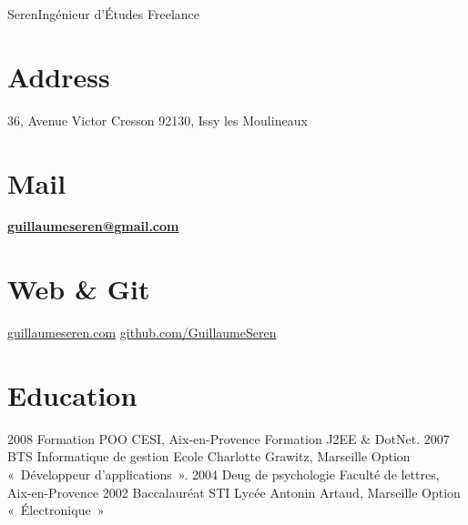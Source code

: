 \documentclass[print]{GuillaumeSeren-cv}
\begin{document}
 {Seren}{Ingénieur d'Études Freelance}

\begin{aside}
  \section{Address}
    36, Avenue Victor Cresson
    92130, Issy les Moulineaux
    ~
  \section{Mail}
    \href{mailto:guillaumeseren@gmail.com}{\textbf{guillaumeseren@gmail.com}}
    ~
  \section{Web \& Git}
    \href{http://guillaumeseren.com/}{guillaumeseren.com}
    \href{https://github.com/GuillaumeSeren}{github.com/GuillaumeSeren}
    ~
\end{aside}

\section{Education}
\begin{entrylist}
  \entry
    {2008}
    {Formation POO}
    {CESI, Aix-en-Provence}
    {Formation J2EE \& DotNet.}
  \entry
    {2007}
    {BTS Informatique de gestion}
    {Ecole Charlotte Grawitz, Marseille}
    {Option « Développeur d'applications ».}
  \entry
    {2004}
    {Deug de psychologie}
    {Faculté de lettres, Aix-en-Provence}
    {}
  \entry
    {2002}
    {Baccalauréat STI}
    {Lycée Antonin Artaud, Marseille}
    {Option « Électronique »}
\end{entrylist}
\end{document}
